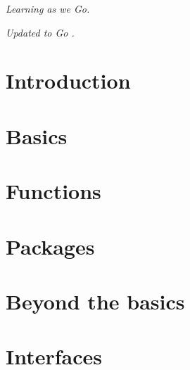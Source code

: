 \documentclass[a4paper,twoside,openleft]{blocksbook}
\begin{document}
\newpage

\thispagestyle{empty}
\begin{figure}[H]
\begin{center}
\end{center}
\end{figure}
\begin{center}
\vfill
\emph{Learning as we Go.}

\emph{\tiny{Updated to Go .}}
\vspace{.2\stockheight}
\end{center}

\clearpage

\tableofcontents*
\listoffigures*
\listoftables*
\listofcode* 
\listofex* 
\clearpage


\chapter{Introduction}
\label{chap:intro}


\chapter{Basics}
\label{chap:basics}


\chapter{Functions}
\label{chap:functions}


\chapter{Packages}
\label{chap:packages}


\chapter{Beyond the basics}
\label{chap:beyond}


\chapter{Interfaces}
\label{chap:interfaces}

\end{document}

